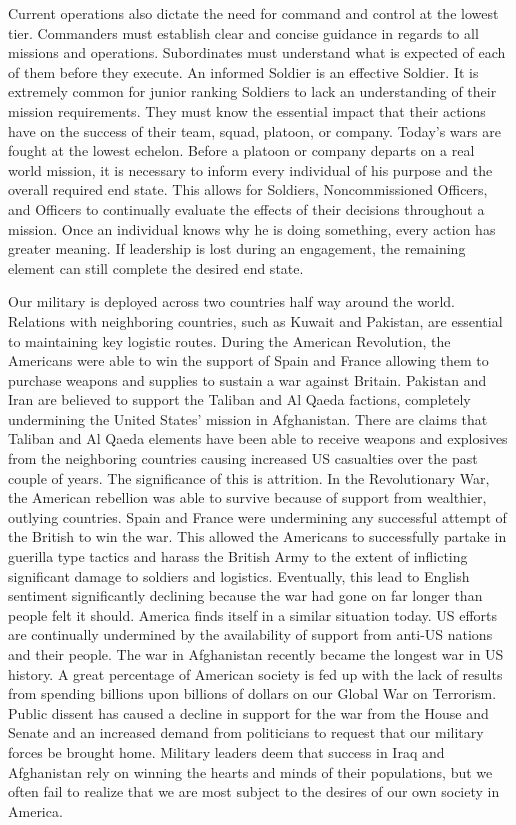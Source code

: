 Current operations also dictate the need for command and control at the lowest
tier.  Commanders must establish clear and concise guidance in regards to all
missions and operations.  Subordinates must understand what is expected of each
of them before they execute.  An informed Soldier is an effective Soldier.  It
is extremely common for junior ranking Soldiers to lack an understanding of
their mission requirements.  They must know the essential impact that their
actions have on the success of their team, squad, platoon, or company.  Today’s
wars are fought at the lowest echelon.  Before a platoon or company departs on
a real world mission, it is necessary to inform every individual of his purpose
and the overall required end state.   This allows for Soldiers, Noncommissioned
Officers, and Officers to continually evaluate the effects of their decisions
throughout a mission.  Once an individual knows why he is doing something,
every action has greater meaning.  If leadership is lost during an engagement,
the remaining element can still complete the desired end state.  

Our military is deployed across two countries half way around the world.
Relations with neighboring countries, such as Kuwait and Pakistan, are
essential to maintaining key logistic routes.  During the American Revolution,
the Americans were able to win the support of Spain and France allowing them to
purchase weapons and supplies to sustain a war against Britain.  Pakistan and
Iran are believed to support the Taliban and Al Qaeda factions, completely
undermining the United States’ mission in Afghanistan.  There are claims that
Taliban and Al Qaeda elements have been able to receive weapons and explosives
from the neighboring countries causing increased US casualties over the past
couple of years.  The significance of this is attrition.  In the Revolutionary
War, the American rebellion was able to survive because of support from
wealthier, outlying countries.  Spain and France were undermining any
successful attempt of the British to win the war.  This allowed the Americans
to successfully partake in guerilla type tactics and harass the British Army to
the extent of inflicting significant damage to soldiers and logistics.
Eventually, this lead to English sentiment significantly declining because the
war had gone on far longer than people felt it should.   America finds itself
in a similar situation today.  US efforts are continually undermined by the
availability of support from anti-US nations and their people.  The war in
Afghanistan recently became the longest war in US history.  A great percentage
of American society is fed up with the lack of results from spending billions
upon billions of dollars on our Global War on Terrorism.  Public dissent has
caused a decline in support for the war from the House and Senate and an
increased demand from politicians to request that our military forces be
brought home.  Military leaders deem that success in Iraq and Afghanistan rely
on winning the hearts and minds of their populations, but we often fail to
realize that we are most subject to the desires of our own society in America.     


